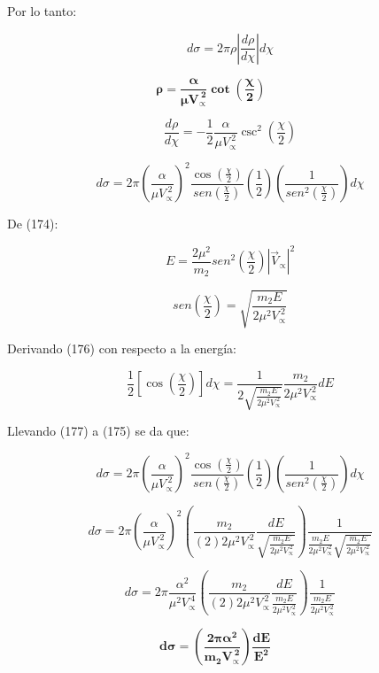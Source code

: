 \documentclass[]{article}
\begin{document}
Por lo tanto:

\[d\sigma = 2\pi\rho\left| \frac{d\rho}{d\chi} \right|d\chi\]

\[\mathbf{\rho =}\frac{\mathbf{\alpha}}{\mathbf{\mu}\mathbf{V}_{\mathbf{\propto}}^{\mathbf{\ 2}}}\mathbf{\cot}\left( \frac{\mathbf{\chi}}{\mathbf{2}} \right)\mathbf{\ \ \ \ \ \ \ \ \ \ \ \ \ \ }\]

\[\frac{d\rho}{d\chi} = - \frac{1}{2}\frac{\alpha}{\mu V_{\propto}^{\ 2}}\csc^{2}\left( \frac{\chi}{2} \right)\]

\[d\sigma = 2\pi\left( \frac{\alpha}{\mu V_{\propto}^{\ 2}} \right)^{2}\frac{\cos\left( \frac{\chi}{2} \right)}{{sen}\left( \frac{\chi}{2} \right)}\left( \frac{1}{2} \right)\left( \frac{1}{{sen}^{2}\left( \frac{\chi}{2} \right)} \right)d\chi\]

De (174):

\[E = \frac{2\mu^{2}}{m_{2}}{sen}^{2}\left( \frac{\chi}{2} \right)\left| {\overrightarrow{V}}_{\propto} \right|^{2}\]

\[{sen}{\left( \frac{\chi}{2} \right) = \sqrt{\frac{m_{2}E}{2\mu^{2}V_{\propto}^{\ 2}}}}\]

Derivando (176) con respecto a la energía:

\[\frac{1}{2}\left\lbrack \cos\left( \frac{\chi}{2} \right) \right\rbrack d\chi = \frac{1}{2\sqrt{\frac{m_{2}E}{2\mu^{2}V_{\propto}^{\ 2}}}}\frac{m_{2}}{2\mu^{2}V_{\propto}^{\ 2}}dE\]

Llevando (177) a (175) se da que:

\[d\sigma = 2\pi\left( \frac{\alpha}{\mu V_{\propto}^{\ 2}} \right)^{2}\frac{\cos\left( \frac{\chi}{2} \right)}{{sen}\left( \frac{\chi}{2} \right)}\left( \frac{1}{2} \right)\left( \frac{1}{{sen}^{2}\left( \frac{\chi}{2} \right)} \right)d\chi\]

\[d\sigma = 2\pi\left( \frac{\alpha}{\mu V_{\propto}^{\ 2}} \right)^{2}\left( \frac{m_{2}}{(2)2\mu^{2}V_{\propto}^{\ 2}}\frac{dE}{\sqrt{\frac{m_{2}E}{2\mu^{2}V_{\propto}^{\ 2}}}} \right)\frac{1}{\frac{m_{2}E}{2\mu^{2}V_{\propto}^{\ 2}}\sqrt{\frac{m_{2}E}{2\mu^{2}V_{\propto}^{\ 2}}}}\]

\[d\sigma = 2\pi\frac{\alpha^{2}}{\mu^{2}V_{\propto}^{\ 4}}\left( \frac{m_{2}}{(2)2\mu^{2}V_{\propto}^{\ 2}}\frac{dE}{\frac{m_{2}E}{2\mu^{2}V_{\propto}^{\ 2}}} \right)\frac{1}{\frac{m_{2}E}{2\mu^{2}V_{\propto}^{\ 2}}}\]

\[\mathbf{d\sigma =}\left( \frac{\mathbf{2}\mathbf{\pi}\mathbf{\alpha}^{\mathbf{2}}}{\mathbf{m}_{\mathbf{2}}\mathbf{V}_{\mathbf{\propto}}^{\mathbf{\ 2}}} \right)\frac{\mathbf{dE}}{\mathbf{E}^{\mathbf{2}}}\mathbf{\ \ \ \ \ \ \ \ \ \ \ }\]
\end{document}
